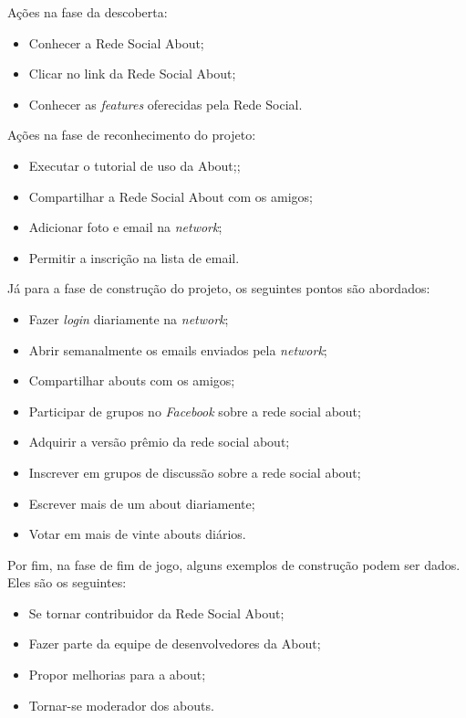 Ações na fase da descoberta:
\begin{itemize}
    \item Conhecer a Rede Social About;
    \item Clicar no link da Rede Social About;
    \item Conhecer as \textit{features} oferecidas pela Rede Social.
\end{itemize}


Ações na fase de reconhecimento do projeto: 
\begin{itemize}
    \item Executar o tutorial de uso da About;;
    \item Compartilhar a Rede Social About com os amigos;
    \item Adicionar foto e email na \textit{network};
    \item Permitir a inscrição na lista de email.
\end{itemize}

Já para a fase de construção do projeto, os seguintes pontos são 
abordados:

\begin{itemize}
    \item Fazer \textit{login} diariamente na \textit{network};
    \item Abrir semanalmente os emails enviados pela \textit{network};
    \item Compartilhar abouts com os amigos;
    \item Participar de grupos no \textit{Facebook} sobre a rede social about;
    \item Adquirir a versão prêmio da rede social about;
    \item Inscrever em grupos de discussão sobre a rede social about;
    \item Escrever mais de um about diariamente;
    \item Votar em mais de vinte abouts diários.
\end{itemize}

Por fim, na fase de fim de jogo, alguns exemplos de construção podem ser dados. Eles são os seguintes:
\begin{itemize}
    \item Se tornar contribuidor da Rede Social About;
    \item Fazer parte da equipe de desenvolvedores da About;
    \item Propor melhorias para a about;
    \item Tornar-se moderador dos abouts.
\end{itemize}

